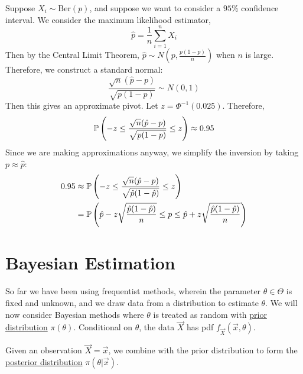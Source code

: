 \documentclass[../Main.tex]{subfiles}
\begin{document}
\begin{example}
    Suppose $X_i \sim \text{Ber}(p)$, and suppose we want to consider a $95\%$ confidence interval. We consider the maximum likelihood estimator,
    \begin{equation*}
        \hat{p} = \frac{1}{n} \sum_{i=1}^{n} X_i
    \end{equation*}
    Then by the Central Limit Theorem, $\hat{p} \sim N(p, \frac{p(1-p)}{n})$ when $n$ is large. Therefore, we construct a standard normal:
    \begin{equation*}
        \frac{\sqrt{n}(\hat{p} - p)}{\sqrt{p(1-p)}} \sim N(0, 1)
    \end{equation*}
    Then this gives an approximate pivot. Let $z = \Phi^{-1}(0.025)$. Therefore,
    \begin{equation*}
        \P\left(-z \leq \frac{\sqrt{n} (\hat{p} - p)}{\sqrt{p(1-p)}} \leq z\right) \approx 0.95
    \end{equation*}
    Since we are making approximations anyway, we simplify the inversion by taking $p \approx \hat{p}$:
    \begin{align*}
        0.95 &\approx \P\left(-z \leq \frac{\sqrt{n} (\hat{p} - p)}{\sqrt{\hat{p}(1-\hat{p})}} \leq z\right) \\
        &= \P\left(\hat{p} - z\sqrt{\frac{\hat{p}(1-\hat{p})}{n}} \leq p \leq \hat{p} + z\sqrt{\frac{\hat{p}(1-\hat{p})}{n}}\right)
    \end{align*}
\end{example}
\section{Bayesian Estimation}
So far we have been using frequentist methods, wherein the parameter $\theta \in \Theta$ is fixed and unknown, and we draw data from a distribution to estimate $\theta$. We will now consider Bayesian methods where $\theta$ is treated as random with \underline{prior distribution} $\pi(\theta)$. Conditional on $\theta$, the data $\vec{X}$ has pdf $f_{\vec{X}}(\vec{x}, \theta)$.

Given an observation $\vec{X} = \vec{x}$, we combine with the prior distribution to form the \underline{posterior distribution} $\pi(\theta | \vec{x})$.
\end{document}
